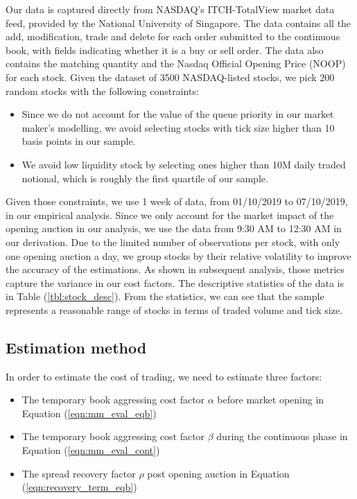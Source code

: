 Our data is captured directly from NASDAQ's ITCH-TotalView market data feed, provided by the National University of Singapore. The data contains all the add, modification, trade and delete for each order submitted to the continuous book, with fields indicating whether it is a buy or sell order. The data also contains the matching quantity and the Nasdaq Official Opening Price (NOOP) for each stock. Given the dataset of 3500 NASDAQ-listed stocks, we pick $200$ random stocks with the following constraints:
\begin{itemize}
  \item Since we do not account for the value of the queue priority in our market maker's modelling, we avoid selecting stocks with tick size higher than 10 basis points in our sample.
  \item We avoid low liquidity stock by selecting ones higher than 10M daily traded notional, which is roughly the first quartile of our sample.
\end{itemize}

Given those constraints, we use 1 week of data, from 01/10/2019 to 07/10/2019, in our empirical analysis. Since we only account for the market impact of the opening auction in our analysis, we use the data from 9:30 AM to 12:30 AM in our derivation. Due to the limited number of observations per stock, with only one opening auction a day, we group stocks by their relative volatility to improve the accuracy of the estimations. As shown in subsequent analysis, those metrics capture the variance in our cost factors. The descriptive statistics of the data is in Table (\ref{tbl:stock_desc}). From the statistics, we can see that the sample represents a reasonable range of stocks in terms of traded volume and tick size.



\subsection{Estimation method}
In order to estimate the cost of trading, we need to estimate three factors:

\begin{itemize}
  \item The temporary book aggressing cost factor $\alpha$ before market opening in Equation (\ref{eqn:mm_eval_eqb})
  \item The temporary book aggressing cost factor $\beta$ during the continuous phase in Equation (\ref{eqn:mm_eval_cont})
  \item The spread recovery factor $\rho$ post opening auction in Equation (\ref{eqn:recovery_term_eqb})
\end{itemize}

